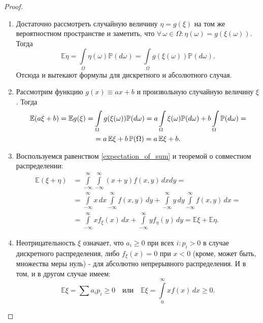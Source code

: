 \begin{proof}
\begin{enumerate}
    \item 
        Достаточно рассмотреть случайную величину $\eta = g(\xi)$ на том же вероятностном пространстве и заметить, что $\forall \, \omega \in \Omega \colon \eta(\omega) = g(\xi(\omega))$. 
        Тогда 
        $$ \mathbb{E}\eta = \int\limits_{\Omega} \eta(\omega) \mathbb{P}(d\omega) = \int\limits_{\Omega} g(\xi(\omega)) \mathbb{P}(d\omega). $$
        Отсюда и вытекают формулы для дискретного и абсолютного случая.
        
    \item 
        Рассмотрим функцию $g(x) \equiv ax + b$ и произвольную случайную величину $\xi$. Тогда 
        \begin{multline*}
            \mathbb{E}(a \xi + b) 
            = \mathbb{E}g(\xi) 
            = \int\limits_{\Omega}g(\xi(\omega))\mathbb{P}(d\omega)
            = a \int\limits_{\Omega}\xi(\omega)\mathbb{P}(d\omega) + b \int\limits_{\Omega}\mathbb{P}(d\omega) = \\
            = a \, \mathbb{E}\xi + b \, {\mathbb{P}(\Omega)} 
            = a \, \mathbb{E}\xi + b.
        \end{multline*}
        
    \item 
        Воспользуемся равенством \eqref{expectation_of_sum} и теоремой о совместном распределении:
        $$\begin{aligned}
            \mathbb{E}(\xi+\eta) &=\int\limits_{-\infty}^{\infty} \int\limits_{-\infty}^{\infty}(x+y) f(x, y) \, dx dy=\\
            &=\int\limits_{-\infty}^{\infty} x \, dx \int\limits_{-\infty}^{\infty} f(x, y) \, dy + \int\limits_{-\infty}^{\infty} y \, dy \int\limits_{-\infty}^{\infty} f(x, y) \, dx=\\
            &=\int\limits_{-\infty}^{\infty} x f_{\xi}(x) \, dx + \int\limits_{-\infty}^{\infty} y f_{\eta}(y) \, dy=\mathbb{E} \xi+\mathbb{E} \eta.
        \end{aligned}$$
    \item 
        Неотрицательность $\xi$ означает, что $a_i \geqslant 0$ при всех $i \colon p_i > 0$ в случае дискретного распределения, либо $f_\xi(x) = 0$ при $x < 0$ (кроме, может быть, множества меры нуль) - для абсолютно непрерывного распределения. 
        И в том, и в другом случае имеем:
        $$\mathbb{E} \xi=\sum a_{i} p_{i} \geqslant 0 \quad \text {или} \quad \mathbb{E} \xi=\int\limits_{0}^{\infty} x f(x) \, dx \geqslant 0.$$
        

\end{enumerate}
\end{proof}
